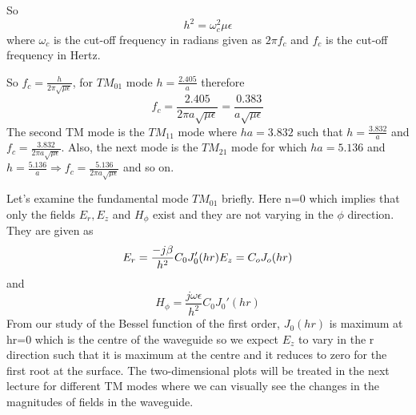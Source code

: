 So
$$
h^2=\omega_c^2\mu\epsilon
$$ 
where $\omega_c$ is the cut-off frequency in radians given as $2\pi f_c$ and $f_c$ is the cut-off frequency in Hertz.

So $f_c =\frac{h}{2\pi\sqrt{\mu\epsilon}}$, for $TM_{01}$ mode $h=\frac{2.405}{a}$ therefore 
$$
f_c=\frac{2.405}{2\pi a\sqrt{\mu\epsilon}} =\frac{0.383}{a\sqrt{\mu\epsilon}}
$$
The second TM mode is the $TM_{11}$ mode where $ha =3.832$ such that $h=\frac{3.832}{a}$ and $f_c=\frac{3.832}{2\pi a\sqrt{\mu\epsilon}}$. Also, the next mode is the $TM_{21}$ mode for which $ha =5.136$ and $h=\frac{5.136}{a} \Longrightarrow f_c=\frac{5.136}{2\pi a\sqrt{\mu\epsilon}}$ and so on. 

Let's examine the fundamental mode $TM_{01}$ briefly. Here n=0 which implies that only the fields $E_r, E_z$ and $H_\phi$ exist and they are not varying in the $\phi$ direction. They are given as
$$
E_r=\frac{-j\beta}{h^2}C_0J_0'(hr)\\
E_z=C_oJ_o(hr)
$$
and
$$
H_\phi=\frac{j\omega\epsilon}{h^2}C_0J_0'(hr)
$$
From our study of the Bessel function of the first order, $J_0(hr)$ is maximum at hr=0 which is the centre of the waveguide so we expect $E_z$ to vary in the r direction such that it is maximum at the centre and it reduces to zero for the first root at the surface. The two-dimensional plots will be treated in the next lecture for different TM modes where we can visually see the changes in the magnitudes of fields in the waveguide.

